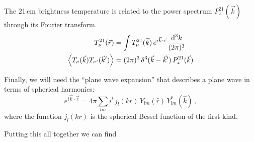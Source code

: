 \begin{bibunit}
\begin{subappendices}
The 21\,cm brightness temperature is related to the power spectrum $P^{21}_z(\vec k)$ through its
Fourier transform.
\begin{align}
    T^{21}_\nu(\vec r) &=
        \int T^{21}_\nu(\vec k) \, e^{i\vec k\cdot\vec r} \, \frac{{\textrm d}^3k}{(2\pi)^3} \\
    \left\langle T_\nu(\vec k) T_{\nu^\prime}(\vec k^\prime) \right\rangle &=
        (2\pi)^3 \, \delta^3(\vec k - \vec k^\prime) \, P^{21}_z(\vec k)
\end{align}

Finally, we will need the ``plane wave expansion'' that describes a plane wave in terms of spherical
harmonics:
\begin{equation}
    e^{i\vec k\cdot\vec r} = 4\pi \sum_{lm} i^l \, j_l(kr) \, Y_{lm}(\hat r) \, Y^*_{lm}(\hat k)\,,
\end{equation}
where the function $j_l(kr)$ is the spherical Bessel function of the first kind.

Putting this all together we can find



\end{subappendices}
\end{bibunit}
